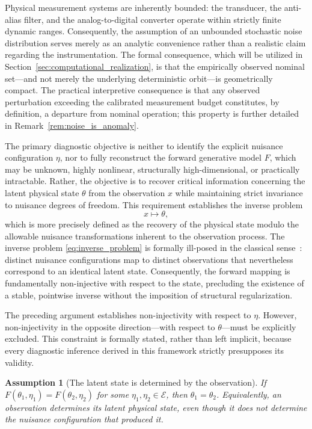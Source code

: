 \documentclass[a4paper]{cas-sc}
\newtheorem{assumption}{Assumption}
\newcommand{\EtaSpace}{\ensuremath{\mathcal{E}}}
\begin{document}
Physical measurement systems are inherently bounded: the transducer, the anti-alias filter, and the analog-to-digital converter operate within strictly finite dynamic ranges. Consequently, the assumption of an unbounded stochastic noise distribution serves merely as an analytic convenience rather than a realistic claim regarding the instrumentation. The formal consequence, which will be utilized in Section~\ref{sec:computational_realization}, is that the empirically observed nominal set---and not merely the underlying deterministic orbit---is geometrically compact. The practical interpretive consequence is that any observed perturbation exceeding the calibrated measurement budget constitutes, by definition, a departure from nominal operation; this property is further detailed in Remark~\ref{rem:noise_is_anomaly}.

The primary diagnostic objective is neither to identify the explicit nuisance configuration \(\eta\), nor to fully reconstruct the forward generative model \(F\), which may be unknown, highly nonlinear, structurally high-dimensional, or practically intractable. Rather, the objective is to recover critical information concerning the latent physical state \(\theta\) from the observation \(x\) while maintaining strict invariance to nuisance degrees of freedom. This requirement establishes the inverse problem
\begin{equation}
    x \longmapsto \theta,
    \label{eq:inverse_problem}
\end{equation}
which is more precisely defined as the recovery of the physical state modulo the allowable nuisance transformations inherent to the observation process. The inverse problem \eqref{eq:inverse_problem} is formally ill-posed in the classical sense~\citep{hadamard1932,tikhonov1977}: distinct nuisance configurations map to distinct observations that nevertheless correspond to an identical latent state. Consequently, the forward mapping is fundamentally non-injective with respect to the state, precluding the existence of a stable, pointwise inverse without the imposition of structural regularization.

The preceding argument establishes non-injectivity with respect to \(\eta\). However, non-injectivity in the opposite direction---with respect to \(\theta\)---must be explicitly excluded. This constraint is formally stated, rather than left implicit, because every diagnostic inference derived in this framework strictly presupposes its validity.

\begin{assumption}[The latent state is determined by the observation]
\label{ass:state_identifiable}
If \(F(\theta_1,\eta_1)=F(\theta_2,\eta_2)\) for some
\(\eta_1,\eta_2\in\EtaSpace\), then \(\theta_1=\theta_2\). Equivalently, an
observation determines its latent physical state, even though it does not
determine the nuisance configuration that produced it.
\end{assumption}
\end{document}
